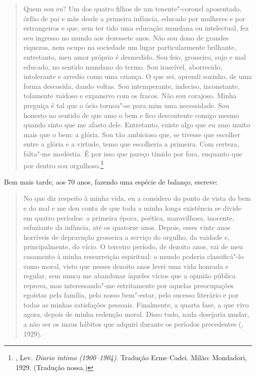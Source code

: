 \begin{quotation}
Quem sou eu? Um dos quatro filhos de um
tenente"-coronel aposentado, órfão de pai e mãe desde a primeira
infância, educado por mulheres e por estrangeiros e que, sem ter tido
uma educação mundana ou intelectual, fez seu ingresso no mundo aos
dezessete anos. Não sou dono de grandes riquezas, nem ocupo na sociedade
um lugar particularmente brilhante, entretanto, meu amor próprio é
desmedido. Sou feio, grosseiro, sujo e mal educado, no sentido mundano
do termo. Sou irascível, aborrecido, intolerante e arredio como uma
criança. O que sei, aprendi sozinho, de uma forma descosida, dando
voltas. Sou intemperante, indeciso, inconstante, tolamente vaidoso e
expansivo com os fracos. Não sou corajoso. Minha preguiça é tal que o
ócio tornou"-se para mim uma necessidade. Sou honesto no sentido de que
amo o bem e fico descontente comigo mesmo quando sinto que me afasto
dele. Entretanto, existe algo que eu amo muito mais que o bem: a glória.
Sou tão ambicioso que, se tivesse que escolher entre a glória e a
virtude, temo que escolheria a primeira. Com certeza, falta"-me modéstia.
É por isso que pareço tímido por fora, enquanto que por dentro sou
orgulhoso.\footnote{, Lev. \emph{Diario intimo (1900--1904)}. Tradução Erme Cadei. Milão: Mondadori, 1929. (Tradução nossa.)}
\end{quotation}

Bem mais tarde, aos 70 anos, fazendo uma espécie de balanço, escreve:

\begin{quotation}
No que diz respeito à minha vida, eu a considero do ponto de vista do
bem e do mal e me dou conta de que toda a minha longa
existência se divide em quatro períodos: a primeira época, poética,
maravilhosa, inocente, esfuziante da infância, até os quatorze anos.
Depois, esses vinte anos horríveis de depravação grosseira a serviço do
orgulho, da vaidade e, principalmente, do vício. O terceiro período, de
dezoito anos, vai de meu casamento à minha ressurreição espiritual: o
mundo poderia classificá"-lo como moral, visto que nesses dezoito anos
levei uma vida honrada e regular, sem nunca me abandonar àqueles vícios
que a opinião pública reprova, mas interessando"-me estritamente por
aquelas preocupações egoístas pela família, pelo nosso bem"-estar, pelo
sucesso literário e por todas as minhas satisfações pessoais. Finalmente,
a quarta fase, a que vivo agora, depois de minha redenção moral. Disso
tudo, nada desejaria mudar, a não ser os maus hábitos que adquiri
durante os períodos precedentes (, 1929). 
\end{quotation}


